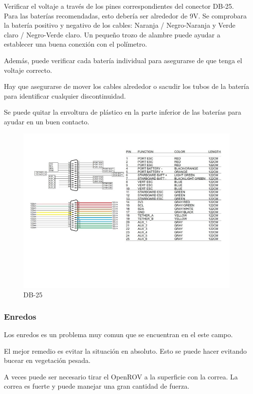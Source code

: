 Verificar el voltaje a través de los pines correspondientes del conector DB-25. Para las baterías recomendadas, esto debería ser alrededor de 9V. Se comprobara la batería positivo y negativo de los cables: Naranja / Negro-Naranja y Verde claro / Negro-Verde claro. Un pequeño trozo de alambre puede ayudar a establecer una buena conexión con el polímetro.

Además, puede verificar cada batería individual para asegurarse de que tenga el voltaje correcto.

Hay que asegurarse de mover los cables alrededor o sacudir los tubos de la batería para identificar cualquier discontinuidad.

Se puede quitar la envoltura de plástico en la parte inferior de las baterías para ayudar en un buen contacto.

\begin{figure} [hbtp]
\begin{center}
  \includegraphics[width=12cm]{img/cap3/3_5/DB-25}
\end{center}
\caption{DB-25}
\label{fig:db25}
\end{figure}

\subsubsection{Enredos}
\label{subsubsec:enredos}
Los enredos es un problema muy comun que se encuentran en el este campo.

El mejor remedio es evitar la situación en absoluto. Esto se puede hacer evitando bucear en vegetación pesada.

A veces puede ser necesario tirar el OpenROV a la superficie con la correa. La correa es fuerte y puede manejar una gran cantidad de fuerza.

